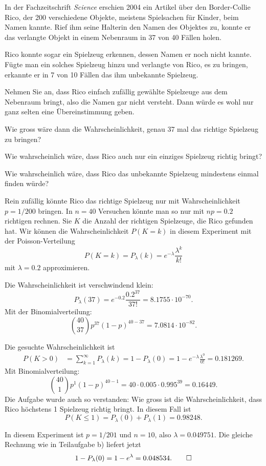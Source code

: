 In der Fachzeitschrift {\em Science} erschien 2004 ein Artikel über den
Border-Collie Rico, der 200 verschiedene Objekte, meistens Spielsachen
für Kinder, beim Namen kannte.
Rief ihm seine Halterin den Namen des Objektes zu, konnte er das verlangte
Objekt in einem Nebenraum in 37 von 40 Fällen holen.

Rico konnte sogar ein Spielzeug erkennen, dessen Namen er noch nicht
kannte.
Fügte man ein solches Spielzeug hinzu und verlangte von Rico, es zu bringen,
erkannte er in 7 von 10 Fällen das ihm unbekannte Spielzeug.

Nehmen Sie an, dass Rico einfach zufällig gewählte Spielzeuge aus
dem Nebenraum bringt, also die Namen gar nicht versteht.
Dann würde es wohl nur ganz selten eine Übereinstimmung geben.
\begin{teilaufgaben}
\item
Wie gross wäre dann die Wahrscheinlichkeit, genau 37 mal das richtige
Spielzeug zu bringen?
\item
Wie wahrscheinlich wäre, dass Rico auch nur ein einziges Spielzeug richtig
bringt?
\item
Wie wahrscheinlich wäre, dass Rico das unbekannte Spielzeug mindestens
einmal finden würde?
\end{teilaufgaben}


\begin{loesung}
Rein zufällig könnte Rico das richtige Spielzeug nur mit Wahrscheinlichkeit
$p=1/200$ bringen.
In $n=40$ Versuchen könnte man so nur mit $np=0.2$ richtigen rechnen.
Sie $K$ die Anzahl der richtigen Spielzeuge, die Rico gefunden hat.
Wir können die Wahrscheinlichkeit $P(K=k)$ in diesem Experiment mit der
Poisson-Verteilung
\[
P(K=k)
=
P_\lambda(k)
=
e^{-\lambda}\frac{\lambda^k}{k!}
\]
mit $\lambda=0.2$ approximieren.
\begin{teilaufgaben}
\item
Die Wahrscheinlichkeit ist verschwindend klein:
\[
P_\lambda(37)
=
e^{-0.2}\frac{0.2^{37}}{37!}=8.1755\cdot10^{-70}.
\]
Mit der Binomialverteilung:
\[
\binom{40}{37}p^{37}(1-p)^{40-37}=7.0814\cdot10^{-82}.
\]
\item
Die gesuchte Wahrscheinlichkeit ist
\begin{align*}
P(K>0)
&=
\sum_{k=1}^\infty P_\lambda(k)
=
1-P_\lambda(0)
=
1-e^{-\lambda}\frac{\lambda^0}{0!}
=
0.181269.
\end{align*}
Mit Binomialverteilung:
\[
\binom{40}{1}p^1(1-p)^{40-1}=40\cdot0.005\cdot 0.995^39 = 0.16449.
\]
Die Aufgabe wurde auch so verstanden: Wie gross ist die Wahrscheinlichkeit,
dass Rico höchstens 1 Spielzeug richtig bringt.
In diesem Fall ist 
\[
P(K\le 1)
=
P_\lambda(0)
+
P_\lambda(1)
=
0.98248.
\]
\item
In diesem Experiment ist $p=1/201$ und $n=10$, also $\lambda=0.049751$.
Die gleiche Rechnung wie in Teilaufgabe b) liefert jetzt
\[
1-P_\lambda(0)
=
1-e^{\lambda}
=0.048534.
\qedhere
\]
\end{teilaufgaben}
\end{loesung}

